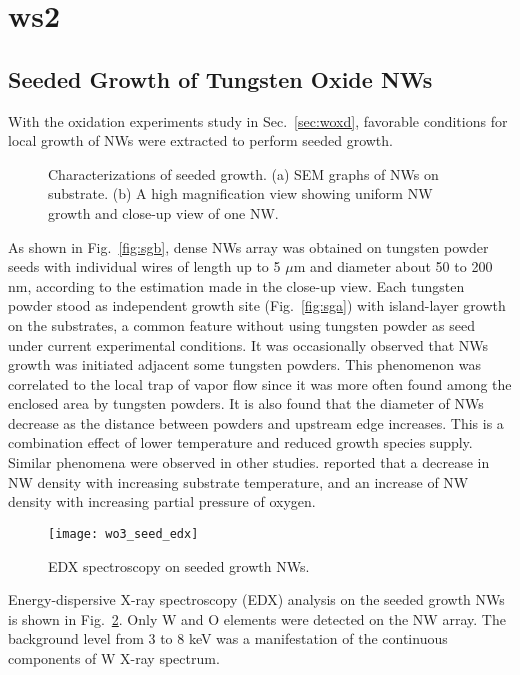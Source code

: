 \section{ws2}
\subsection{Seeded Growth of Tungsten Oxide NWs}
With the oxidation experiments study in Sec.~\ref{sec:woxd}, favorable conditions for local growth of NWs were extracted to perform seeded growth. 

\begin{figure}[htb]
\centering
{}\hspace{0.04\textwidth}
\caption[Characterization of seeded growth : SEM]{Characterizations of seeded growth. (a) SEM graphs of  NWs on  substrate. (b) A high magnification view showing uniform NW growth and close-up view of one NW. }
\label{fig:woseedsem}
\end{figure}

As shown in Fig.~\ref{fig:sgb}, dense NWs array was obtained on tungsten powder seeds with individual wires of length up to 5 $\mu$m and diameter about 50 to 200 nm, according to the estimation made in the close-up view. Each tungsten powder stood as independent growth site (Fig.~\ref{fig:sga}) with island-layer growth on the substrates, a common feature without using tungsten powder as seed under current experimental conditions. It was occasionally observed that NWs growth was initiated adjacent some tungsten powders. This phenomenon was correlated to the local trap of vapor flow since it was more often found among the enclosed area by tungsten powders. It is also found that the diameter of NWs decrease as the distance between powders and upstream edge increases. This is a combination effect of lower temperature and reduced  growth species supply. Similar phenomena were observed in other studies. \citeauthor{Thangala2007} reported that a decrease in NW density with increasing substrate temperature, and an increase of NW density with increasing partial pressure of oxygen.\cite{Thangala2007}

\begin{figure}[htb]
\centering
\texttt{[image: wo3\_seed\_edx]}
\caption[Composition analysis on seeded growth  NWs]{EDX spectroscopy on seeded growth  NWs.}
\label{fig:woedx}
\end{figure}
Energy-dispersive X-ray spectroscopy (EDX) analysis on the seeded growth  NWs is shown in Fig.~\ref{fig:woedx}. Only W and O elements were detected on the NW array. The background level from 3 to 8 keV was a manifestation of the continuous components of W X-ray spectrum. 

